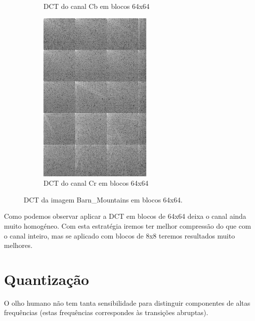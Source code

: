 \documentclass[a4paper, 12pt]{article}
\begin{document}
\begin{figure}[H]
\begin{subfigure}{0.3\textwidth}
                \caption{ DCT do canal Cb em blocos 64x64}
            \end{subfigure}
            \hfill
            \begin{subfigure}{0.3\textwidth}
                \centering
                \includegraphics[scale=0.5]{resources/DCT/CRdct64.png}
                \caption{ DCT do canal Cr em blocos 64x64}
            \end{subfigure}
            \caption{\label{fig:my_label} DCT da imagem Barn\_Mountains em blocos 64x64.}
        \end{figure}

        Como podemos observar aplicar a DCT em blocos de 64x64 deixa o canal ainda muito homogéneo.
        Com esta estratégia iremos ter melhor compressão do que com o canal inteiro, mas se aplicado
        com blocos de 8x8 teremos resultados muito melhores.


\pagebreak
\section{Quantização}
    O olho humano não tem tanta sensibilidade para distinguir componentes de altas frequências
    (estas frequências correspondes às transições abruptas).
\end{document}
